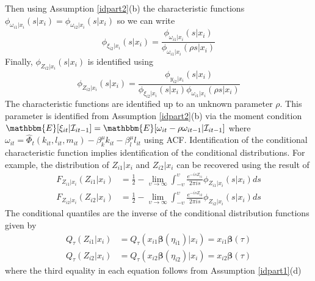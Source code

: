 \documentclass[11pt]{article}
\begin{document}
Then using Assumption \ref{idpart2}(b) the characteristic functions $\phi_{\omega_{i1}|x_{i}}(s|x_{i})=\phi_{\omega_{i2}|x_{i}}(s|x_{i})$ so we can write
\begin{equation*}
\phi_{\xi_{i2}|x_{i}}(s|x_{i})=\frac{\phi_{\omega_{i1}|x_{i}}(s|x_{i})}{\phi_{\omega_{i1}|x_{i}}(\rho s|x_{i})}
\end{equation*}
Finally, $\phi_{Z_{i2}|x_{i}}(s|x_{i})$ is identified using
\begin{equation*}
\phi_{Z_{i2}|x_{i}}(s|x_{i})=\frac{\phi_{y_{i2}|x_{i}}(s|x_{i})}{\phi_{\xi_{i2}|x_{i}}(s|x_{i})\phi_{\omega_{i1}|x_{i}}(\rho s|x_{i})}
\end{equation*}
The characteristic functions are identified up to an unknown parameter $\rho$. This parameter is identified from Assumption \ref{idpart2}(b) via the moment condition $\mathbbm{E}[\xi_{it}|\mathcal{I}_{it-1}]=\mathbbm{E}[\omega_{it}-\rho\omega_{it-1}|\mathcal{I}_{it-1}]$ where $\omega_{it}=\hat{\Phi}_{t}(k_{it}, l_{it}, m_{it})-\beta^{\mu}_{k}k_{it}-\beta^{\mu}_{l}l_{it}$ using ACF. Identification of the conditional characteristic function implies identification of the conditional distributions. For example, the distribution of $Z_{i1}|x_{i}$ and $Z_{i2}|x_{i}$ can be recovered using the result of \cite{gil}
\begin{equation*}
\begin{split}
F_{Z_{i1}|x_{i}}(Z_{i1}|x_{i})&=\frac{1}{2}-\underset{\upsilon\rightarrow \infty}{\operatorname{lim}}\int_{-\upsilon}^{\upsilon}\frac{e^{-isZ_{i1}}}{2\pi is}\phi_{Z_{i1}|x_{i}}(s|x_{i})ds\\
F_{Z_{i2}|x_{i}}(Z_{i2}|x_{i})&=\frac{1}{2}-\underset{\upsilon\rightarrow \infty}{\operatorname{lim}}\int_{-\upsilon}^{\upsilon}\frac{e^{-isZ_{i2}}}{2\pi is}\phi_{Z_{i2}|x_{i}}(s|x_{i})ds
\end{split}
\end{equation*}
The conditional quantiles are the inverse of the conditional distribution functions given by
\begin{equation*}
\begin{split}
Q_{\tau}(Z_{i1}|x_{i})&=Q_{\tau}(x_{i1}\boldsymbol\beta(\eta_{i1})|x_{i})=x_{i1}\boldsymbol\beta(\tau)\\
Q_{\tau}(Z_{i2}|x_{i})&=Q_{\tau}(x_{i2}\boldsymbol\beta(\eta_{i2})|x_{i})=x_{i2}\boldsymbol\beta(\tau)
\end{split}
\end{equation*}
where the third equality in each equation follows from Assumption \eqref{idpart1}(d)
\end{document}
